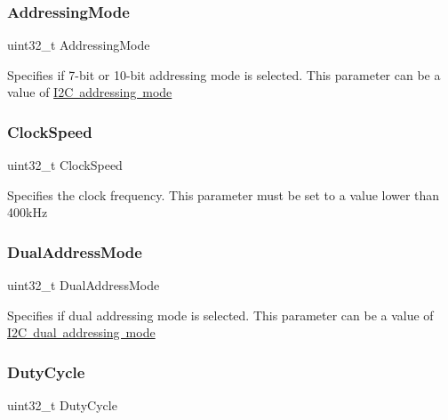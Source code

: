 \subsubsection{\texorpdfstring{Addressing\+Mode}{AddressingMode}}
{\footnotesize\ttfamily uint32\+\_\+t Addressing\+Mode}

Specifies if 7-\/bit or 10-\/bit addressing mode is selected. This parameter can be a value of \mbox{\hyperlink{group___i2_c__addressing__mode}{I2C addressing mode}} \mbox{\label{struct_i2_c___init_type_def_a2e90d47d6a9a180f8c3126c70102d562}} 
\subsubsection{\texorpdfstring{Clock\+Speed}{ClockSpeed}}
{\footnotesize\ttfamily uint32\+\_\+t Clock\+Speed}

Specifies the clock frequency. This parameter must be set to a value lower than 400k\+Hz \mbox{\label{struct_i2_c___init_type_def_aabb4e156aa4af60dfaf591419e9b1a07}} 
\subsubsection{\texorpdfstring{Dual\+Address\+Mode}{DualAddressMode}}
{\footnotesize\ttfamily uint32\+\_\+t Dual\+Address\+Mode}

Specifies if dual addressing mode is selected. This parameter can be a value of \mbox{\hyperlink{group___i2_c__dual__addressing__mode}{I2C dual addressing mode}} \mbox{\label{struct_i2_c___init_type_def_a762a4d954f3ccee6017e31fe902fb1c1}} 
\subsubsection{\texorpdfstring{Duty\+Cycle}{DutyCycle}}
{\footnotesize\ttfamily uint32\+\_\+t Duty\+Cycle}

